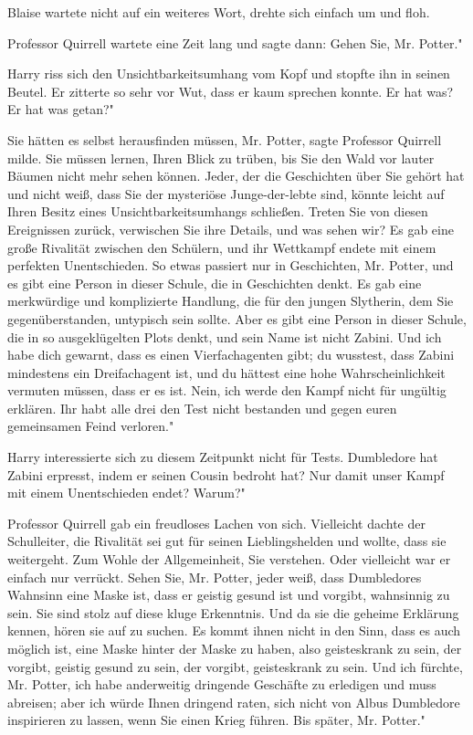 Blaise wartete nicht auf ein weiteres Wort, drehte sich einfach um und floh.

Professor Quirrell wartete eine Zeit lang und sagte dann: \glqq{}Gehen Sie, Mr.
Potter."

Harry riss sich den Unsichtbarkeitsumhang vom Kopf und stopfte ihn in seinen
Beutel. Er zitterte so sehr vor Wut, dass er kaum sprechen konnte. \glqq{}Er hat
was? Er hat was getan?"

\glqq{}Sie hätten es selbst herausfinden müssen, Mr. Potter\grqq{}, sagte
Professor Quirrell milde. \glqq{}Sie müssen lernen, Ihren Blick zu trüben, bis
Sie den Wald vor lauter Bäumen nicht mehr sehen können. Jeder, der die
Geschichten über Sie gehört hat und nicht weiß, dass Sie der mysteriöse
Junge-der-lebte sind, könnte leicht auf Ihren Besitz eines
Unsichtbarkeitsumhangs schließen. Treten Sie von diesen Ereignissen zurück,
verwischen Sie ihre Details, und was sehen wir? Es gab eine große Rivalität
zwischen den Schülern, und ihr Wettkampf endete mit einem perfekten
Unentschieden. So etwas passiert nur in Geschichten, Mr. Potter, und es gibt
eine Person in dieser Schule, die in Geschichten denkt. Es gab eine merkwürdige
und komplizierte Handlung, die für den jungen Slytherin, dem Sie
gegenüberstanden, untypisch sein sollte. Aber es gibt eine Person in dieser
Schule, die in so ausgeklügelten Plots denkt, und sein Name ist nicht Zabini.
Und ich habe dich gewarnt, dass es einen Vierfachagenten gibt; du wusstest, dass
Zabini mindestens ein Dreifachagent ist, und du hättest eine hohe
Wahrscheinlichkeit vermuten müssen, dass er es ist. Nein, ich werde den Kampf
nicht für ungültig erklären. Ihr habt alle drei den Test nicht bestanden und
gegen euren gemeinsamen Feind verloren."

Harry interessierte sich zu diesem Zeitpunkt nicht für Tests. \glqq{}Dumbledore
hat Zabini erpresst, indem er seinen Cousin bedroht hat? Nur damit unser Kampf
mit einem Unentschieden endet? Warum?"

Professor Quirrell gab ein freudloses Lachen von sich. \glqq{}Vielleicht dachte
der Schulleiter, die Rivalität sei gut für seinen Lieblingshelden und wollte,
dass sie weitergeht. Zum Wohle der Allgemeinheit, Sie verstehen. Oder vielleicht
war er einfach nur verrückt. Sehen Sie, Mr. Potter, jeder weiß, dass Dumbledores
Wahnsinn eine Maske ist, dass er geistig gesund ist und vorgibt, wahnsinnig zu
sein. Sie sind stolz auf diese kluge Erkenntnis. Und da sie die geheime
Erklärung kennen, hören sie auf zu suchen. Es kommt ihnen nicht in den Sinn,
dass es auch möglich ist, eine Maske hinter der Maske zu haben, also
geisteskrank zu sein, der vorgibt, geistig gesund zu sein, der vorgibt,
geisteskrank zu sein. Und ich fürchte, Mr. Potter, ich habe anderweitig
dringende Geschäfte zu erledigen und muss abreisen; aber ich würde Ihnen
dringend raten, sich nicht von Albus Dumbledore inspirieren zu lassen, wenn Sie
einen Krieg führen. Bis später, Mr. Potter."

